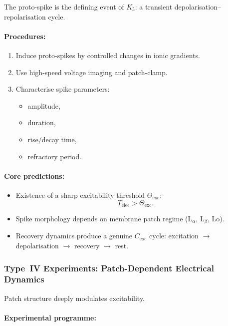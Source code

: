 The proto-spike is the defining event of $K_5$: 
a transient depolarisation–repolarisation cycle.

\paragraph{Procedures:}

\begin{enumerate}
    \item Induce proto-spikes by controlled changes in ionic gradients.
    \item Use high-speed voltage imaging and patch-clamp.
    \item Characterise spike parameters:
          \begin{itemize}
              \item amplitude,
              \item duration,
              \item rise/decay time,
              \item refractory period.
          \end{itemize}
\end{enumerate}

\paragraph{Core predictions:}

\begin{itemize}
    \item Existence of a sharp excitability threshold $\Theta_{\mathrm{exc}}$:
          \[
              T_{\mathrm{elec}} > \Theta_{\mathrm{exc}}.
          \]
    \item Spike morphology depends on membrane patch regime 
          (L$_\alpha$, L$_\beta$, Lo).
    \item Recovery dynamics produce a genuine $C_{\mathrm{exc}}$ cycle:
          excitation $\rightarrow$ depolarisation $\rightarrow$ 
          recovery $\rightarrow$ rest.
\end{itemize}



\subsubsection{Type~IV Experiments: Patch-Dependent Electrical Dynamics}

Patch structure deeply modulates excitability.

\paragraph{Experimental programme:}

